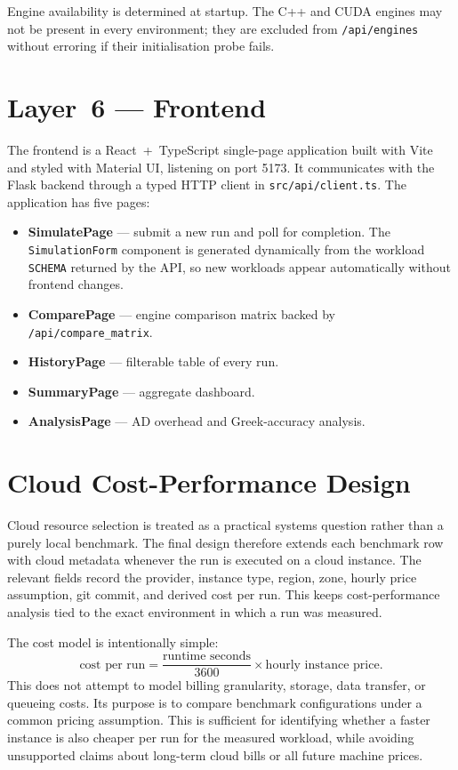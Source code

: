 Engine availability is determined at startup. The C++ and CUDA engines may not
be present in every environment; they are excluded from \texttt{/api/engines}
without erroring if their initialisation probe fails.

\section{Layer~6 --- Frontend}
\label{sec:frontend-layer}

The frontend is a React~+~TypeScript single-page application built with Vite
and styled with Material UI, listening on port 5173. It communicates with the
Flask backend through a typed HTTP client in \texttt{src/api/client.ts}. The
application has five pages:

\begin{itemize}
    \item \textbf{SimulatePage} --- submit a new run and poll for completion.
          The \texttt{SimulationForm} component is generated dynamically from
          the workload \texttt{SCHEMA} returned by the API, so new workloads
          appear automatically without frontend changes.
    \item \textbf{ComparePage} --- engine comparison matrix backed by
          \texttt{/api/compare\_matrix}.
    \item \textbf{HistoryPage} --- filterable table of every run.
    \item \textbf{SummaryPage} --- aggregate dashboard.
    \item \textbf{AnalysisPage} --- AD overhead and Greek-accuracy analysis.
\end{itemize}

\section{Cloud Cost-Performance Design}
\label{sec:cloud-cost-design}

Cloud resource selection is treated as a practical systems question rather
than a purely local benchmark. The final design therefore extends each
benchmark row with cloud metadata whenever the run is
executed on a cloud instance. The relevant fields record the provider, instance
type, region, zone, hourly price assumption, git commit, and derived cost per
run. This keeps cost-performance analysis tied to the exact environment in
which a run was measured.

The cost model is intentionally simple:
\[
    \text{cost per run}
    =
    \frac{\text{runtime seconds}}{3600}
    \times
    \text{hourly instance price}.
\]
This does not attempt to model billing granularity, storage, data transfer, or
queueing costs. Its purpose is to compare benchmark configurations under a
common pricing assumption. This is sufficient for identifying whether a faster
instance is also cheaper per run for the measured workload, while avoiding
unsupported claims about long-term cloud bills or all future machine prices.

